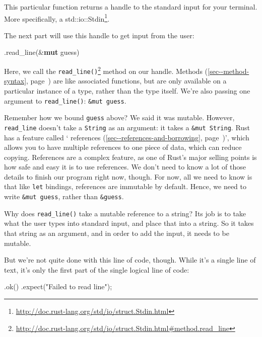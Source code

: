 \documentclass[a4paper,]{book}
\renewcommand*{\hyperref}[2][\ar]{%
  \def\ar{#2}%
  #2 (\autoref{#1}, page~\pageref{#1})}
\newenvironment{Shaded}{\begin{snugshade}}{\end{snugshade}}
\newcommand{\KeywordTok}[1]{\textcolor[rgb]{0.13,0.29,0.53}{\textbf{{#1}}}}
\newcommand{\StringTok}[1]{\textcolor[rgb]{0.31,0.60,0.02}{{#1}}}
\newcommand{\NormalTok}[1]{{#1}}
\renewcommand{\href}[2]{#2\footnote{\url{#1}}}
\begin{document}
This particular function returns a handle to the standard input for your
terminal. More specifically, a
\href{http://doc.rust-lang.org/std/io/struct.Stdin.html}{std::io::Stdin}.

The next part will use this handle to get input from the user:

\begin{Shaded}
\begin{Highlighting}[]
\NormalTok{.read_line(&}\KeywordTok{mut} \NormalTok{guess)}
\end{Highlighting}
\end{Shaded}

Here, we call the
\href{http://doc.rust-lang.org/std/io/struct.Stdin.html\#method.read_line}{\texttt{read\_line()}}
method on our handle. \hyperref[sec--method-syntax]{Methods} are like
associated functions, but are only available on a particular instance of
a type, rather than the type itself. We're also passing one argument to
\texttt{read\_line()}: \texttt{\&mut\ guess}.

Remember how we bound \texttt{guess} above? We said it was mutable.
However, \texttt{read\_line} doesn't take a \texttt{String} as an
argument: it takes a \texttt{\&mut\ String}. Rust has a feature called
`\hyperref[sec--references-and-borrowing]{references}', which allows you
to have multiple references to one piece of data, which can reduce
copying. References are a complex feature, as one of Rust's major
selling points is how safe and easy it is to use references. We don't
need to know a lot of those details to finish our program right now,
though. For now, all we need to know is that like \texttt{let} bindings,
references are immutable by default. Hence, we need to write
\texttt{\&mut\ guess}, rather than \texttt{\&guess}.

Why does \texttt{read\_line()} take a mutable reference to a string? Its
job is to take what the user types into standard input, and place that
into a string. So it takes that string as an argument, and in order to
add the input, it needs to be mutable.

But we're not quite done with this line of code, though. While it's a
single line of text, it's only the first part of the single logical line
of code:

\begin{Shaded}
\begin{Highlighting}[]
        \NormalTok{.ok()}
        \NormalTok{.expect(}\StringTok{"Failed to read line"}\NormalTok{);}
\end{Highlighting}
\end{Shaded}
\end{document}
